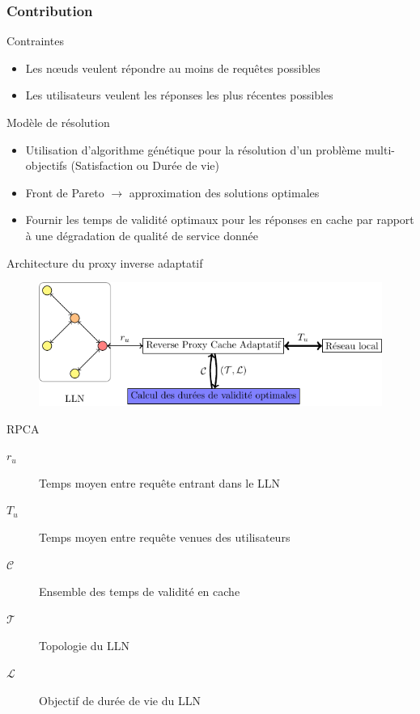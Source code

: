 \begin{frame}\frametitle{Contribution}

  \begin{block}{Contraintes}
    \begin{itemize}
      \item Les nœuds veulent répondre au moins de requêtes possibles
      \item Les utilisateurs veulent les réponses les plus récentes possibles
    \end{itemize}
  \end{block}

  \begin{alertblock}{Modèle de résolution}
    \begin{itemize}
      \item Utilisation d'algorithme génétique pour la résolution d'un problème multi-objectifs (Satisfaction ou Durée de vie)
      \item Front de Pareto $\to$ approximation des solutions optimales
      \item Fournir les temps de validité optimaux pour les réponses en cache par rapport à une dégradation de qualité de service donnée
    \end{itemize}
  \end{alertblock}

\end{frame}

\begin{frame}{Architecture du proxy inverse adaptatif}
  \begin{figure}
    \centering
    \includegraphics[width=.8\textwidth]{figures/schema_rpca_slides.pdf}
  \end{figure}

  \begin{block}{RPCA}
     \begin{description}
       \item[$r_u$] Temps moyen entre requête entrant dans le LLN
       \item[$T_u$] Temps moyen entre requête venues des utilisateurs
       \item[$\mathcal{C}$] Ensemble des temps de validité en cache
       \item[$\mathcal{T}$] Topologie du LLN
       \item[$\mathcal{L}$] Objectif de durée de vie du LLN
     \end{description}
  \end{block}
\end{frame}

